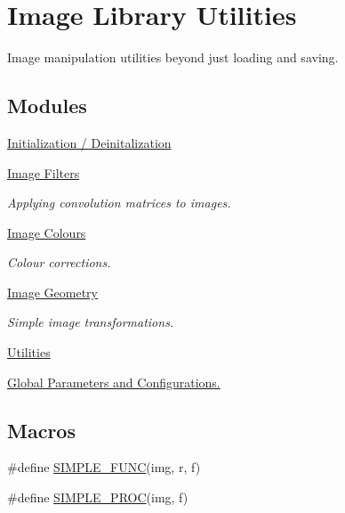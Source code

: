 \hypertarget{group___i_l_u}{\section{Image Library Utilities}
\label{group___i_l_u}
}


Image manipulation utilities beyond just loading and saving.  


\subsection*{Modules}
\begin{DoxyCompactItemize}
\item 
\hyperlink{group__ilu__setup}{Initialization / Deinitalization}
\item 
\hyperlink{group__ilu__filter}{Image Filters}
\begin{DoxyCompactList}\small\item\em Applying convolution matrices to images. \end{DoxyCompactList}\item 
\hyperlink{group__ilu__colour}{Image Colours}
\begin{DoxyCompactList}\small\item\em Colour corrections. \end{DoxyCompactList}\item 
\hyperlink{group__ilu__geometry}{Image Geometry}
\begin{DoxyCompactList}\small\item\em Simple image transformations. \end{DoxyCompactList}\item 
\hyperlink{group__ilu__util}{Utilities}
\item 
\hyperlink{group__ilu__state}{Global Parameters and Configurations.}
\end{DoxyCompactItemize}
\subsection*{Macros}
\begin{DoxyCompactItemize}
\item 
\#define \hyperlink{group___i_l_u_gae03210f6b49f7893564886742e1c601f}{S\+I\+M\+P\+L\+E\+\_\+\+F\+U\+N\+C}(img, r, f)
\item 
\#define \hyperlink{group___i_l_u_ga260bbe56f23e83e488d095877d70f75c}{S\+I\+M\+P\+L\+E\+\_\+\+P\+R\+O\+C}(img, f)
\end{DoxyCompactItemize}
